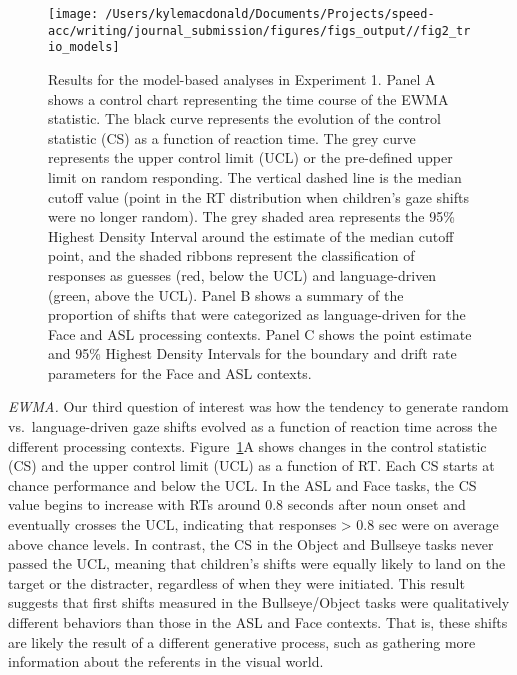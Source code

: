\documentclass[,man,floatsintext]{apa6}
\begin{document}
\begin{figure}[!ht]

{\centering \texttt{[image: /Users/kylemacdonald/Documents/Projects/speed-acc/writing/journal\_submission/figures/figs\_output//fig2\_trio\_models]} 

}

\caption{Results for the model-based analyses in Experiment 1. Panel A shows a control chart representing the time course of the EWMA statistic. The black curve represents the evolution of the control statistic (CS) as a function of reaction time. The grey curve represents the upper control limit (UCL) or the pre-defined upper limit on random responding. The vertical dashed line is the median cutoff value (point in the RT distribution when children's gaze shifts were no longer random). The grey shaded area represents the 95\% Highest Density Interval around the estimate of the median cutoff point, and the shaded ribbons represent the classification of responses as guesses (red, below the UCL) and language-driven (green, above the UCL). Panel B shows a summary of the proportion of shifts that were categorized as language-driven for the Face and ASL processing contexts. Panel C shows the point estimate and 95\% Highest Density Intervals for the boundary and drift rate parameters for the Face and ASL contexts.}\label{fig:trio-model-plot}
\end{figure}

\emph{EWMA.} Our third question of interest was how the tendency to generate random vs.~language-driven gaze shifts evolved as a function of reaction time across the different processing contexts. Figure~\ref{fig:trio-model-plot}A shows changes in the control statistic (CS) and the upper control limit (UCL) as a function of RT. Each CS starts at chance performance and below the UCL. In the ASL and Face tasks, the CS value begins to increase with RTs around 0.8 seconds after noun onset and eventually crosses the UCL, indicating that responses \textgreater{} 0.8 sec were on average above chance levels. In contrast, the CS in the Object and Bullseye tasks never passed the UCL, meaning that children's shifts were equally likely to land on the target or the distracter, regardless of when they were initiated. This result suggests that first shifts measured in the Bullseye/Object tasks were qualitatively different behaviors than those in the ASL and Face contexts. That is, these shifts are likely the result of a different generative process, such as gathering more information about the referents in the visual world.
\end{document}
